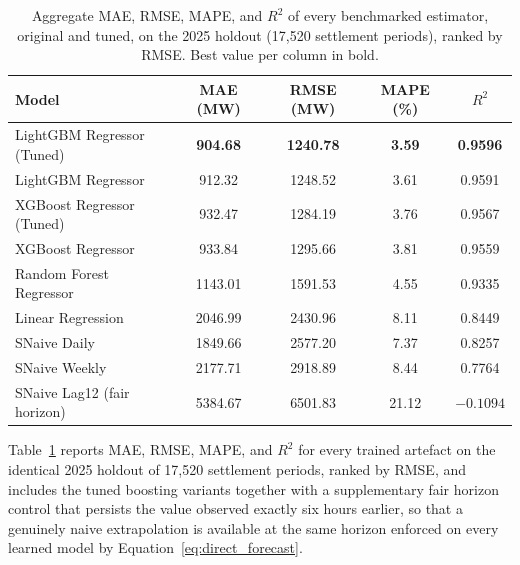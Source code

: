 \documentclass[runningheads]{llncs}
\begin{document}
\begin{table}[H]
\centering
\small
\caption{Aggregate MAE, RMSE, MAPE, and $R^2$ of every benchmarked estimator, original and tuned, on the 2025 holdout (17{,}520 settlement periods), ranked by RMSE. Best value per column in bold.}
\label{tab:benchmark}
\begin{tabular}{lcccc}
\toprule
\textbf{Model} & \textbf{MAE (MW)} & \textbf{RMSE (MW)} & \textbf{MAPE (\%)} & \textbf{$R^2$} \\
\midrule
LightGBM Regressor (Tuned)  & \textbf{904.68} & \textbf{1240.78} & \textbf{3.59} & \textbf{0.9596} \\
LightGBM Regressor          & 912.32  & 1248.52 & 3.61  & 0.9591 \\
XGBoost Regressor (Tuned)   & 932.47  & 1284.19 & 3.76  & 0.9567 \\
XGBoost Regressor           & 933.84  & 1295.66 & 3.81  & 0.9559 \\
Random Forest Regressor     & 1143.01 & 1591.53 & 4.55  & 0.9335 \\
Linear Regression            & 2046.99 & 2430.96 & 8.11  & 0.8449 \\
SNaive Daily                 & 1849.66 & 2577.20 & 7.37  & 0.8257 \\
SNaive Weekly                 & 2177.71 & 2918.89 & 8.44  & 0.7764 \\
SNaive Lag12 (fair horizon)   & 5384.67 & 6501.83 & 21.12 & $-0.1094$ \\
\bottomrule
\end{tabular}
\end{table}


Table~\ref{tab:benchmark} reports MAE, RMSE, MAPE, and $R^2$ for every trained artefact on the identical 2025 holdout of 17{,}520 settlement periods, ranked by RMSE, and includes the tuned boosting variants together with a supplementary fair horizon control that persists the value observed exactly six hours earlier, so that a genuinely naive extrapolation is available at the same horizon enforced on every learned model by Equation~\ref{eq:direct_forecast}.
\end{document}
